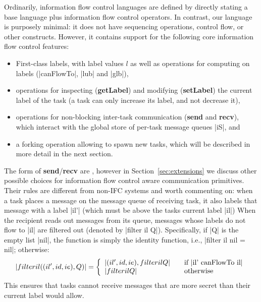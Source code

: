 Ordinarily, information flow control languages are defined by directly
stating a base language plus information flow control operators.  In
contrast, our language is purposely minimal: it does not have sequencing
operations, control flow, or other constructs.  However, it contains
support for the following core information flow control features:

\begin{itemize}
    \item First-class labels, with label values $l$ as well as operations for computing on
labels (|canFlowTo|, |lub| and |glb|),
    \item operations for inspecting (\textbf{getLabel}) and modifying (\textbf{setLabel}) the current label of the task (a task can only increase its label, and not decrease it),
    \item operations for non-blocking inter-task communication (\textbf{send} and \textbf{recv}),
        which interact with the global store of per-task message queues |iS|, and
    \item a forking operation allowing to spawn new tasks, which will be described in more detail in the next section.
\end{itemize}

The form of \textbf{send}/\textbf{recv} are  , however in Section~\ref{sec:extensions} we
discuss other possible choices for information flow control aware communication
primitives.  Their rules are different from non-IFC systems
and worth commenting on: when a task places
a message on the message queue of receiving task, it also labels that
message with a label |il'| (which must be above the tasks current label |il|)
When the recipient reads out messages from its queue,
messages whose labels do not
flow to |il| are filtered out (denoted by |filter il Q|).
Specifically, if |Q| is the empty list |nil|, the
function is simply the identity function, i.e.,
|filter il nil = nil|; otherwise:
\[
|filter il ((il', id, ie) , Q )| = \left\{
\begin{array}{l l}
|(il', id, ie) , filter il Q| & \quad \text{if |il' canFlowTo il|}\\
|filter il Q| & \quad \text{otherwise}
\end{array} \right.
\]
This ensures that tasks cannot receive messages that are more secret
than their current label would allow.


